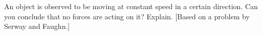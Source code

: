 An object is observed to be moving at constant speed in a
certain direction. Can you conclude that no forces are
acting on it? Explain. [Based on a problem by Serway and Faughn.]
